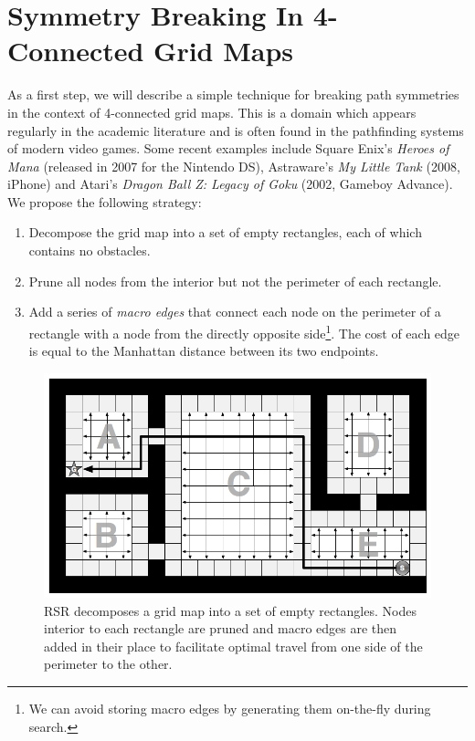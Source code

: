 \section{Symmetry Breaking In 4-Connected Grid Maps}
\label{cha::rsr::symm4c}

As a first step, we will describe a simple technique for breaking path symmetries 
in the context of 4-connected grid maps.
This is a domain which appears regularly in the academic literature
\citep{yap02,wang08,pochter10} and is often found in the pathfinding systems of
modern video games.  Some recent examples include Square Enix's \emph{Heroes of
Mana} (released in 2007 for the Nintendo DS), Astraware's \emph{My Little Tank}
(2008, iPhone) and Atari's \emph{Dragon Ball Z: Legacy of Goku} (2002, Gameboy
Advance). We propose the following strategy:

\begin{enumerate}
\item{Decompose the grid map into a set of empty rectangles, each of which contains no obstacles.}
\item{Prune all nodes from the interior but not the perimeter of each rectangle.}
\item{Add a series of \emph{macro edges} that connect each node on the perimeter of a rectangle
with a node from the directly opposite side\footnote{We can avoid storing macro edges by 
generating them on-the-fly during search.}.
The cost of each edge is equal to the Manhattan distance between its two endpoints.
}
\end{enumerate}

\begin{figure}[t]
\begin{center}
\includegraphics[scale=0.30, trim = 10mm 10mm 10mm 0mm]{chapter_rsr/diagrams/4c_example.png}
\end{center}
\vspace{-3pt}
\caption{RSR decomposes a grid map into a set of empty rectangles. 
Nodes interior to each rectangle are pruned and macro edges are then added 
in their place to facilitate optimal travel from one side of the perimeter to the other.}
\label{fig::rsr::overview}
\end{figure}

